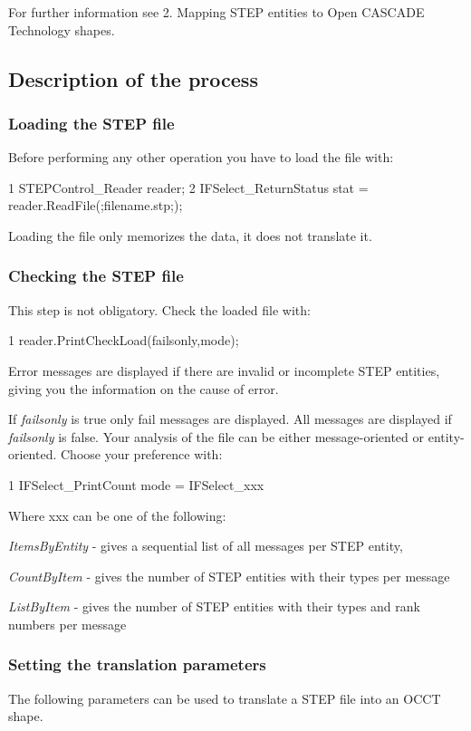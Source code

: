 For further information see 2. Mapping S\+T\+EP entities to Open C\+A\+S\+C\+A\+DE Technology shapes.\hypertarget{occt_user_guides__step_occt_step_2_3}{}\subsection{Description of the process}\label{occt_user_guides__step_occt_step_2_3}
\hypertarget{occt_user_guides__step_occt_step_2_3_1}{}\subsubsection{Loading the S\+T\+E\+P file}\label{occt_user_guides__step_occt_step_2_3_1}
Before performing any other operation you have to load the file with\+: 
\begin{DoxyCode}
1 STEPControl\_Reader reader; 
2 IFSelect\_ReturnStatus stat = reader.ReadFile(;filename.stp;); 
\end{DoxyCode}
 Loading the file only memorizes the data, it does not translate it.\hypertarget{occt_user_guides__step_occt_step_2_3_2}{}\subsubsection{Checking the S\+T\+E\+P file}\label{occt_user_guides__step_occt_step_2_3_2}
This step is not obligatory. Check the loaded file with\+: 
\begin{DoxyCode}
1 reader.PrintCheckLoad(failsonly,mode); 
\end{DoxyCode}
 Error messages are displayed if there are invalid or incomplete S\+T\+EP entities, giving you the information on the cause of error.

If {\itshape failsonly} is true only fail messages are displayed. All messages are displayed if {\itshape failsonly} is false. Your analysis of the file can be either message-\/oriented or entity-\/oriented. Choose your preference with\+: 
\begin{DoxyCode}
1 IFSelect\_PrintCount mode = IFSelect\_xxx 
\end{DoxyCode}
 Where xxx can be one of the following\+:
\begin{DoxyItemize}
\item {\itshape Items\+By\+Entity} -\/ gives a sequential list of all messages per S\+T\+EP entity,
\item {\itshape Count\+By\+Item} -\/ gives the number of S\+T\+EP entities with their types per message
\item {\itshape List\+By\+Item} -\/ gives the number of S\+T\+EP entities with their types and rank numbers per message
\end{DoxyItemize}\hypertarget{occt_user_guides__step_occt_step_2_3_3}{}\subsubsection{Setting the translation parameters}\label{occt_user_guides__step_occt_step_2_3_3}
The following parameters can be used to translate a S\+T\+EP file into an O\+C\+CT shape.

